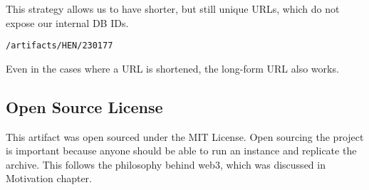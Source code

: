 This strategy allows us to have shorter, but still unique URLs, which do not expose our internal DB IDs.

\texttt{/artifacts/HEN/230177}

Even in the cases where a URL is shortened, the long-form URL also works.


\subsection{Open Source License}

This artifact was open sourced under the MIT License.
Open sourcing the project is important because anyone should be able to run an instance and replicate the archive. This follows the philosophy behind web3, which was discussed in Motivation chapter.

















